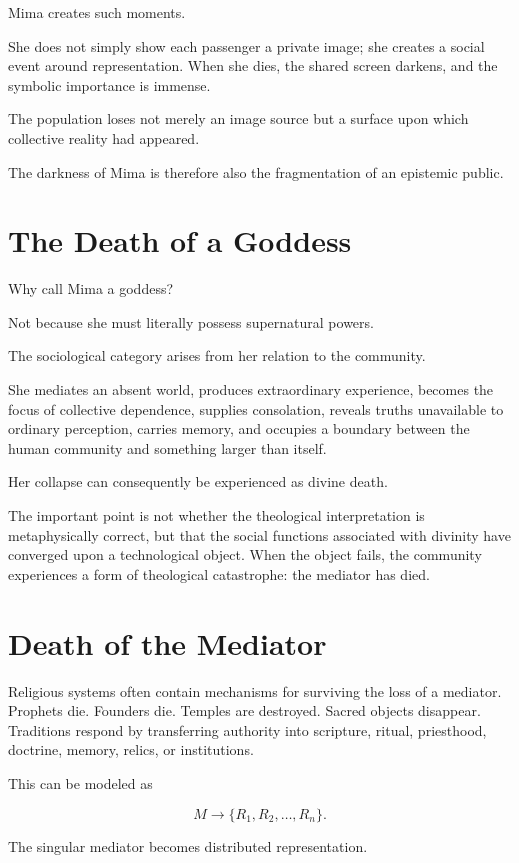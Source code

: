 \documentclass[11pt,oneside]{book}
\theoremstyle{definition}
\theoremstyle{remark}
\begin{document}
Mima creates such moments.

She does not simply show each passenger a private image; she creates a social event around representation. When she dies, the shared screen darkens, and the symbolic importance is immense.

The population loses not merely an image source but a surface upon which collective reality had appeared.

The darkness of Mima is therefore also the fragmentation of an epistemic public.

\section{The Death of a Goddess}

Why call Mima a goddess?

Not because she must literally possess supernatural powers.

The sociological category arises from her relation to the community.

She mediates an absent world, produces extraordinary experience, becomes the focus of collective dependence, supplies consolation, reveals truths unavailable to ordinary perception, carries memory, and occupies a boundary between the human community and something larger than itself.

Her collapse can consequently be experienced as divine death.

The important point is not whether the theological interpretation is metaphysically correct, but that the social functions associated with divinity have converged upon a technological object. When the object fails, the community experiences a form of theological catastrophe: the mediator has died.

\section{Death of the Mediator}

Religious systems often contain mechanisms for surviving the loss of a mediator. Prophets die. Founders die. Temples are destroyed. Sacred objects disappear. Traditions respond by transferring authority into scripture, ritual, priesthood, doctrine, memory, relics, or institutions.

This can be modeled as

\[
M
\rightarrow
\{R_1,R_2,\ldots,R_n\}.
\]

The singular mediator becomes distributed representation.
\end{document}
